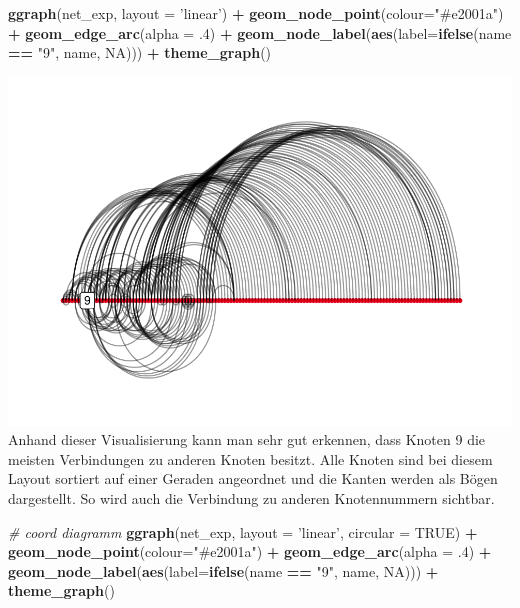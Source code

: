\documentclass[
  12 pt,
]{article}
\newenvironment{Shaded}{\begin{snugshade}}{\end{snugshade}}
\newcommand{\CommentTok}[1]{\textcolor[rgb]{0.56,0.35,0.01}{\textit{#1}}}
\newcommand{\DataTypeTok}[1]{\textcolor[rgb]{0.13,0.29,0.53}{#1}}
\newcommand{\FloatTok}[1]{\textcolor[rgb]{0.00,0.00,0.81}{#1}}
\newcommand{\KeywordTok}[1]{\textcolor[rgb]{0.13,0.29,0.53}{\textbf{#1}}}
\newcommand{\NormalTok}[1]{#1}
\newcommand{\OperatorTok}[1]{\textcolor[rgb]{0.81,0.36,0.00}{\textbf{#1}}}
\newcommand{\OtherTok}[1]{\textcolor[rgb]{0.56,0.35,0.01}{#1}}
\newcommand{\StringTok}[1]{\textcolor[rgb]{0.31,0.60,0.02}{#1}}
\begin{document}
\newpage

\begin{Shaded}
\begin{Highlighting}[]
\KeywordTok{ggraph}\NormalTok{(net_exp, }\DataTypeTok{layout =} \StringTok{'linear'}\NormalTok{) }\OperatorTok{+}\StringTok{ }
\StringTok{  }\KeywordTok{geom_node_point}\NormalTok{(}\DataTypeTok{colour=}\StringTok{"#e2001a"}\NormalTok{) }\OperatorTok{+}\StringTok{ }
\StringTok{  }\KeywordTok{geom_edge_arc}\NormalTok{(}\DataTypeTok{alpha =} \FloatTok{.4}\NormalTok{) }\OperatorTok{+}
\StringTok{  }\KeywordTok{geom_node_label}\NormalTok{(}\KeywordTok{aes}\NormalTok{(}\DataTypeTok{label=}\KeywordTok{ifelse}\NormalTok{(name }\OperatorTok{==}\StringTok{ "9"}\NormalTok{, name, }\OtherTok{NA}\NormalTok{))) }\OperatorTok{+}
\StringTok{  }\KeywordTok{theme_graph}\NormalTok{()}
\end{Highlighting}
\end{Shaded}

\includegraphics{BUBECK_FERDINAND_SNA_Assignment_files/figure-latex/unnamed-chunk-3-1.pdf}
Anhand dieser Visualisierung kann man sehr gut erkennen, dass Knoten 9
die meisten Verbindungen zu anderen Knoten besitzt. Alle Knoten sind bei
diesem Layout sortiert auf einer Geraden angeordnet und die Kanten
werden als Bögen dargestellt. So wird auch die Verbindung zu anderen
Knotennummern sichtbar.

\newpage

\begin{Shaded}
\begin{Highlighting}[]
\CommentTok{# coord diagramm}
\KeywordTok{ggraph}\NormalTok{(net_exp, }\DataTypeTok{layout =} \StringTok{'linear'}\NormalTok{, }\DataTypeTok{circular =} \OtherTok{TRUE}\NormalTok{) }\OperatorTok{+}\StringTok{ }
\StringTok{  }\KeywordTok{geom_node_point}\NormalTok{(}\DataTypeTok{colour=}\StringTok{"#e2001a"}\NormalTok{) }\OperatorTok{+}
\StringTok{  }\KeywordTok{geom_edge_arc}\NormalTok{(}\DataTypeTok{alpha =} \FloatTok{.4}\NormalTok{) }\OperatorTok{+}
\StringTok{  }\KeywordTok{geom_node_label}\NormalTok{(}\KeywordTok{aes}\NormalTok{(}\DataTypeTok{label=}\KeywordTok{ifelse}\NormalTok{(name }\OperatorTok{==}\StringTok{ "9"}\NormalTok{, name, }\OtherTok{NA}\NormalTok{))) }\OperatorTok{+}
\StringTok{  }\KeywordTok{theme_graph}\NormalTok{()}
\end{Highlighting}
\end{Shaded}
\end{document}
